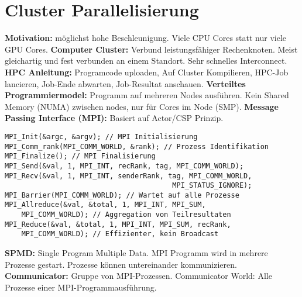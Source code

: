 \section{Cluster Parallelisierung}
\textbf{Motivation:} möglichst hohe Beschleunigung. Viele CPU Cores statt nur viele GPU Cores.
\textbf{Computer Cluster:} Verbund leistungsfähiger Rechenknoten.
Meist gleichartig und fest verbunden an einem Standort. Sehr schnelles Interconnect.
\textbf{HPC Anleitung:} Programcode uploaden, Auf Cluster Kompilieren, HPC-Job lancieren, Job-Ende abwarten, Job-Resultat anschauen.
\textbf{Verteiltes Programmiermodel:} Programm auf mehreren Nodes ausführen. Kein Shared Memory (NUMA) zwischen nodes, nur für Cores im Node (SMP).
\textbf{Message Passing Interface (MPI):} Basiert auf Actor/CSP Prinzip.
\begin{lstlisting}
MPI_Init(&argc, &argv); // MPI Initialisierung 
MPI_Comm_rank(MPI_COMM_WORLD, &rank); // Prozess Identifikation
MPI_Finalize(); // MPI Finalisierung
MPI_Send(&val, 1, MPI_INT, recRank, tag, MPI_COMM_WORLD);
MPI_Recv(&val, 1, MPI_INT, senderRank, tag, MPI_COMM_WORLD, 
                                        MPI_STATUS_IGNORE);
MPI_Barrier(MPI_COMM_WORLD); // Wartet auf alle Prozesse
MPI_Allreduce(&val, &total, 1, MPI_INT, MPI_SUM, 
    MPI_COMM_WORLD); // Aggregation von Teilresultaten
MPI_Reduce(&val, &total, 1, MPI_INT, MPI_SUM, recRank, 
    MPI_COMM_WORLD); // Effizienter, kein Broadcast
\end{lstlisting}
\textbf{SPMD:} Single Program Multiple Data. MPI Programm wird in mehrere Prozesse gestart.
Prozesse können untereinander kommunizieren.
\textbf{Communicator:} Gruppe von MPI-Prozessen. 
Communicator World: Alle Prozesse einer MPI-Programmausführung.